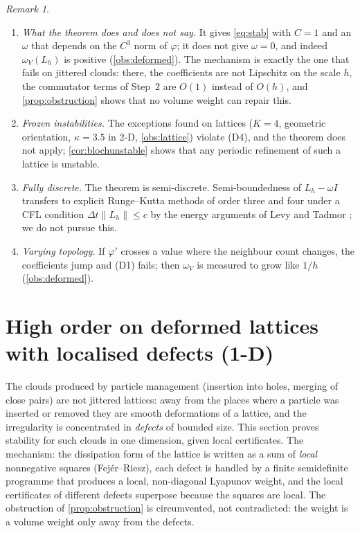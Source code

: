 \documentclass[11pt,a4paper]{article}
\theoremstyle{plain}
\theoremstyle{definition}
\theoremstyle{remark}
\newtheorem{remark}[theorem]{Remark}
\numberwithin{equation}{section}
\begin{document}
\begin{remark}\label{rem:deformed}
\begin{enumerate}[label=(\roman*)]
\item \emph{What the theorem does and does not say.} It gives \eqref{eq:stab} with $C=1$ and an $\omega$ that depends on the $C^3$ norm of $\varphi$; it does not give $\omega=0$, and indeed $\omega_V(L_h)$ is positive (\cref{obs:deformed}). The mechanism is exactly the one that fails on jittered clouds: there, the coefficients are not Lipschitz on the scale $h$, the commutator terms of Step~2 are $O(1)$ instead of $O(h)$, and \cref{prop:obstruction} shows that no volume weight can repair this.
\item \emph{Frozen instabilities.} The exceptions found on lattices ($K=4$, geometric orientation, $\kappa=3.5$ in 2-D, \cref{obs:lattice}) violate (D4), and the theorem does not apply; \cref{cor:blochunstable} shows that any periodic refinement of such a lattice is unstable.
\item \emph{Fully discrete.} The theorem is semi-discrete. Semi-boundedness of $L_h-\omega I$ transfers to explicit Runge--Kutta methods of order three and four under a CFL condition $\Delta t\|L_h\|\le c$ by the energy arguments of Levy and Tadmor \cite{LevyTadmor1998,Tadmor2002}; we do not pursue this.
\item \emph{Varying topology.} If $\varphi'$ crosses a value where the neighbour count changes, the coefficients jump and (D1) fails; then $\omega_V$ is measured to grow like $1/h$ (\cref{obs:deformed}).
\end{enumerate}
\end{remark}

\section{High order on deformed lattices with localised defects (1-D)}\label{sec:defects}

The clouds produced by particle management (insertion into holes, merging of close pairs) are not jittered lattices: away from the places where a particle was inserted or removed they are smooth deformations of a lattice, and the irregularity is concentrated in \emph{defects} of bounded size. This section proves stability for such clouds in one dimension, given local certificates. The mechanism: the dissipation form of the lattice is written as a sum of \emph{local} nonnegative squares (Fej\'er--Riesz), each defect is handled by a finite semidefinite programme that produces a local, non-diagonal Lyapunov weight, and the local certificates of different defects superpose because the squares are local. The obstruction of \cref{prop:obstruction} is circumvented, not contradicted: the weight is a volume weight only away from the defects.
\end{document}
